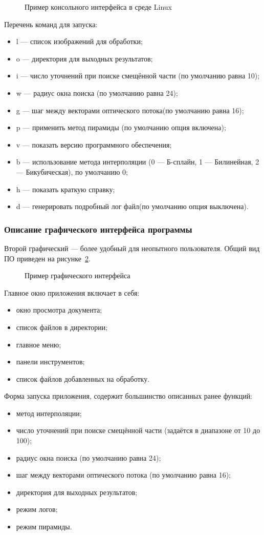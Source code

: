 \begin{figure}[h!]
\caption{Пример консольного интерфейса в среде Linux}
\label{pic:con_scr}
\end{figure}

Перечень команд для запуска:
\begin{itemize}
\item l — список изображений для обработки;
\item o — директория для выходных результатов;
\item i — число уточнений при поиске смещённой части (по умолчанию равна 10);
\item w — радиус окна поиска (по умолчанию равна 24);
\item g — шаг между векторами оптического потока(по умолчанию равна 16);
\item p — применить метод пирамиды (по умолчанию опция включена);
\item v — показать версию программного обеспечения;
\item b — использование метода интерполяции (0 — Б-сплайн, 1 — Билинейная, 2 — Бикубическая), по умолчанию 0;
\item h — показать краткую справку;
\item d — генерировать подробный лог файл(по умолчанию опция выключена).
\end{itemize}
\subsubsection{Описание графического интерфейса программы}
Второй графический — более удобный для неопытного пользователя. Общий вид ПО приведен на рисунке \ref{pic:gui_scr}. 
\begin{figure}[h!]
\caption{Пример графического интерфейса}
\label{pic:gui_scr}
\end{figure}
Главное окно приложения включает в себя:
\begin{itemize}
\item окно просмотра документа;
\item список файлов в директории;
\item главное меню;
\item панели инструментов;
\item список файлов добавленных на обработку.
\end{itemize}
Форма запуска приложения, содержит большинство описанных ранее функций:
\begin{itemize}
\item метод интерполяции;
\item число уточнений при поиске смещённой части (задаётся в диапазоне от 10 до 100);
\item радиус окна поиска (по умолчанию равна 24);
\item шаг между векторами оптического потока (по умолчанию равна 16);
\item директория для выходных результатов;
\item режим логов;
\item режим пирамиды.
\end{itemize}